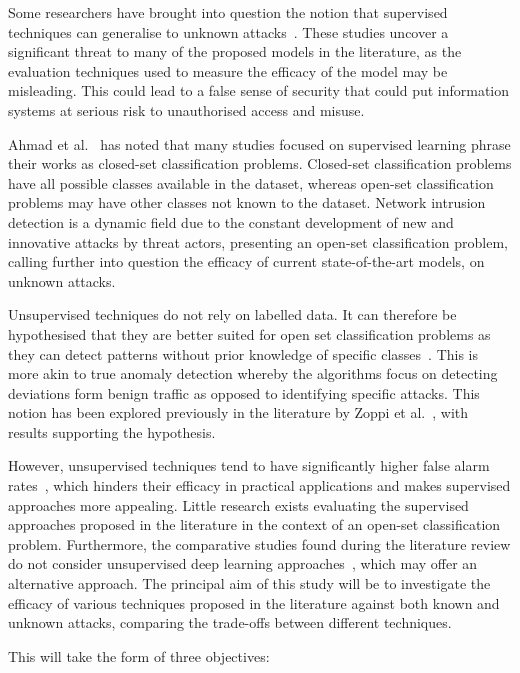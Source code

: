Some researchers have brought into question the notion that supervised
techniques can generalise to unknown attacks~\cite{Kus, Zoppi}. These studies
uncover a significant threat to many of the proposed models in the literature,
as the evaluation techniques used to measure the efficacy of the model may be
misleading. This could lead to a false sense of security that could put
information systems at serious risk to unauthorised access and misuse.

Ahmad et al.~\cite{zero-day} has noted that many studies focused on supervised
learning phrase their works as closed-set classification problems. Closed-set
classification problems have all possible classes available in the dataset,
whereas open-set classification problems may have other classes not known to
the dataset. Network intrusion detection is a dynamic field due to the constant
development of new and innovative attacks by threat actors, presenting an
open-set classification problem, calling further into question the efficacy of
current state-of-the-art models, on unknown attacks.

Unsupervised techniques do not rely on labelled data. It can therefore be
hypothesised that they are better suited for open set classification problems
as they can detect patterns without prior knowledge of specific
classes~\cite{unsupervised_ml}. This is more akin to true anomaly detection
whereby the algorithms focus on detecting deviations form benign traffic as
opposed to identifying specific attacks. This notion has been explored
previously in the literature by Zoppi et al.~\cite{Zoppi}, with results
supporting the hypothesis.

However, unsupervised techniques tend to have significantly higher false alarm
rates~\cite{Zoppi}, which hinders their efficacy in practical applications and
makes supervised approaches more appealing. Little research exists evaluating
the supervised approaches proposed in the literature in the context of an
open-set classification problem. Furthermore, the comparative studies found
during the literature review do not consider unsupervised deep learning
approaches~\cite{Kus, Zoppi}, which may offer an alternative approach. The
principal aim of this study will be to investigate the efficacy of various
techniques proposed in the literature against both known and unknown attacks,
comparing the trade-offs between different techniques.

This will take the form of three objectives:

\hypertarget{obj}{}

